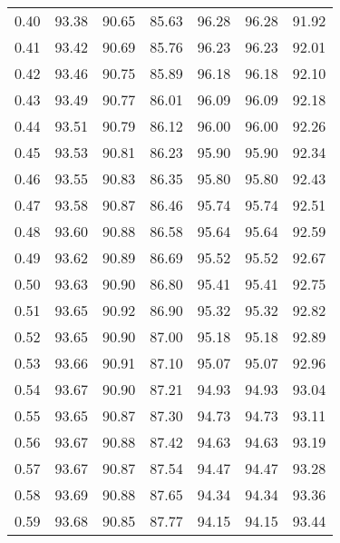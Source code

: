 \begin{tabular}{|c|c|c|c|c|c|c|}
      0.40 &     93.38 &     90.65 &      85.63 &   96.28 &      96.28 &         91.92 \\
      0.41 &     93.42 &     90.69 &      85.76 &   96.23 &      96.23 &         92.01 \\
      0.42 &     93.46 &     90.75 &      85.89 &   96.18 &      96.18 &         92.10 \\
      0.43 &     93.49 &     90.77 &      86.01 &   96.09 &      96.09 &         92.18 \\
      0.44 &     93.51 &     90.79 &      86.12 &   96.00 &      96.00 &         92.26 \\
      0.45 &     93.53 &     90.81 &      86.23 &   95.90 &      95.90 &         92.34 \\
      0.46 &     93.55 &     90.83 &      86.35 &   95.80 &      95.80 &         92.43 \\
      0.47 &     93.58 &     90.87 &      86.46 &   95.74 &      95.74 &         92.51 \\
      0.48 &     93.60 &     90.88 &      86.58 &   95.64 &      95.64 &         92.59 \\
      0.49 &     93.62 &     90.89 &      86.69 &   95.52 &      95.52 &         92.67 \\
      0.50 &     93.63 &     90.90 &      86.80 &   95.41 &      95.41 &         92.75 \\
      0.51 &     93.65 &     90.92 &      86.90 &   95.32 &      95.32 &         92.82 \\
      0.52 &     93.65 &     90.90 &      87.00 &   95.18 &      95.18 &         92.89 \\
      0.53 &     93.66 &     90.91 &      87.10 &   95.07 &      95.07 &         92.96 \\
      0.54 &     93.67 &     90.90 &      87.21 &   94.93 &      94.93 &         93.04 \\
      0.55 &     93.65 &     90.87 &      87.30 &   94.73 &      94.73 &         93.11 \\
      0.56 &     93.67 &     90.88 &      87.42 &   94.63 &      94.63 &         93.19 \\
      0.57 &     93.67 &     90.87 &      87.54 &   94.47 &      94.47 &         93.28 \\
      0.58 &     93.69 &     90.88 &      87.65 &   94.34 &      94.34 &         93.36 \\
      0.59 &     93.68 &     90.85 &      87.77 &   94.15 &      94.15 &         93.44 \\

\end{tabular}
